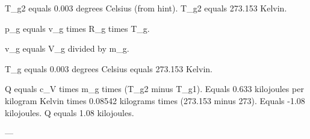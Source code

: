 T_g2 equals 0.003 degrees Celsius (from hint).  
T_g2 equals 273.153 Kelvin.  

p_g equals v_g times R_g times T_g.  

v_g equals V_g divided by m_g.  

T_g equals 0.003 degrees Celsius equals 273.153 Kelvin.  

Q equals c_V times m_g times (T_g2 minus T_g1).  
Equals 0.633 kilojoules per kilogram Kelvin times 0.08542 kilograms times (273.153 minus 273).  
Equals -1.08 kilojoules.  
Q equals 1.08 kilojoules.  

---